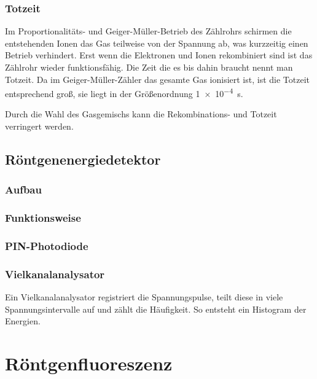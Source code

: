 \subsubsection{Totzeit}

Im Proportionalitäts- und Geiger-Müller-Betrieb des Zählrohrs schirmen die
entstehenden Ionen das Gas teilweise von der Spannung ab, was kurzzeitig
einen Betrieb verhindert. Erst wenn die Elektronen und Ionen rekombiniert
sind ist das Zählrohr wieder funktionsfähig. Die Zeit die es bis dahin
braucht nennt man Totzeit. Da im Geiger-Müller-Zähler das gesamte Gas
ionisiert ist, ist die Totzeit entsprechend groß, sie liegt in der
Größenordnung \SI{1e-4}{\second}.

Durch die Wahl des Gasgemischs kann die Rekombinations- und Totzeit
verringert werden.

\subsection{Röntgenenergiedetektor}

\subsubsection{Aufbau}

\subsubsection{Funktionsweise}

\subsubsection{PIN-Photodiode}

\parencite[Abschnitt~„Photodiode“]{wikipedia/pin-Diode}

\subsubsection{Vielkanalanalysator}

Ein Vielkanalanalysator registriert die Spannungspulse, teilt diese in viele
Spannungsintervalle auf und zählt die Häufigkeit.
\parencite{Phywe/Vierkanalanalysator} So entsteht ein Histogram der Energien.
\parencite{wikipedia/Vielkanalanalysator}

\section{Röntgenfluoreszenz}


